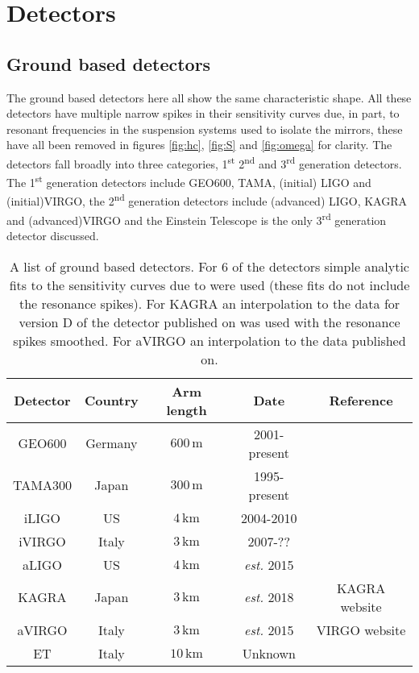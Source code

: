 \newpage
\section{Detectors}\label{sec:detectors}

\subsection{Ground based detectors}
The ground based detectors here all show the same characteristic shape. All these detectors have multiple narrow spikes in their sensitivity curves due, in part, to resonant frequencies in the suspension  systems used to isolate the mirrors, these have all been removed in figures \ref{fig:hc}, \ref{fig:S} and \ref{fig:omega} for clarity. The detectors fall broadly into three categories, 1\textsuperscript{st} 2\textsuperscript{nd} and 3\textsuperscript{rd} generation detectors. The 1\textsuperscript{st} generation detectors include GEO600, TAMA, (initial) LIGO and (initial)VIRGO, the 2\textsuperscript{nd} generation detectors include (advanced) LIGO, KAGRA and (advanced)VIRGO and the Einstein Telescope is the only 3\textsuperscript{rd} generation detector discussed.


\begin{table}[h!]
\label{table:1}
\centering
\begin{tabular}{ c c c c c }
\hline
{\bf Detector} & {\bf Country} & {\bf Arm length} & {\bf Date} & {\bf Reference} \\
\hline
  GEO600 	& Germany 	& $600\,\textrm{m}$ 	& 2001-present			& \cite{Sathyaprakash} \\
  TAMA300 	& Japan		& $300\,\textrm{m}$ 	& 1995-present			& \cite{Sathyaprakash} \\
  iLIGO 	& US 		& $4\,\textrm{km}$ 	& 2004-2010 			& \cite{Sathyaprakash} \\
  iVIRGO		& Italy		& $3\,\textrm{km}$ 	& 2007-??			& \cite{Sathyaprakash} \\
  aLIGO 	& US		& $4\,\textrm{km}$ 	& \emph{est.} 2015	 	& \cite{Sathyaprakash} \\
  KAGRA 	& Japan 	& $3\,\textrm{km}$ 	& \emph{est.} 2018	 	& KAGRA website \\
  aVIRGO	& Italy 	& $3\,\textrm{km}$ 	& \emph{est.} 2015	 	& VIRGO website \\
  ET 		& Italy		& $10\,\textrm{km}$ 	& Unknown 			& \cite{Sathyaprakash} \\
\hline
\end{tabular}
\caption{A list of ground based detectors. For 6 of the detectors simple analytic fits to the sensitivity curves due to \cite{Sathyaprakash} were used (these fits do not include the resonance spikes). For KAGRA an interpolation to the data for version D of the detector published on \cite{KAGRAwebsite} was used with the resonance spikes smoothed. For aVIRGO an interpolation to the data published on.}
\end{table}





